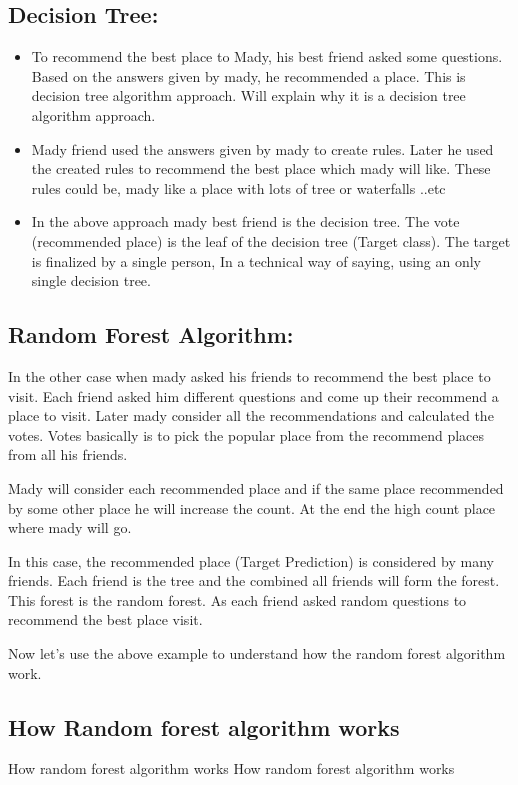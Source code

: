\documentclass[a4paper,12pt]{article}
\begin{document}
\subsection*{Decision Tree:}
\begin{itemize}
	\item To recommend the best place to Mady, his best friend asked some questions. Based on the answers given by mady, he recommended a place. This is decision tree algorithm approach. Will explain why it is a decision tree algorithm approach.
	
\item	Mady friend used the answers given by mady to create rules. Later he used the created rules to recommend the best place which mady will like. These rules could be, mady like a place with lots of tree or waterfalls ..etc
	
\item In the above approach mady best friend is the decision tree. The vote (recommended place) is the leaf of the decision tree (Target class). The target is finalized by a single person, In a technical way of saying, using an only single decision tree.
\end{itemize}


\subsection*{Random Forest Algorithm:}
In the other case when mady asked his friends to recommend the best place to visit. Each friend asked him different questions and come up their recommend a place to visit. Later mady consider all the recommendations and calculated the votes. Votes basically is to pick the popular place from the recommend places from all his friends.

Mady will consider each recommended place and if the same place recommended by some other place he will increase the count. At the end the high count place where mady will go.

In this case, the recommended place (Target Prediction) is considered by many friends. Each friend is the tree and the combined all friends will form the forest. This forest is the random forest. As each friend asked random questions to recommend the best place visit.

Now let’s use the above example to understand how the random forest algorithm work.

\subsection*{How Random forest algorithm works}
How random forest algorithm works
How random forest algorithm works
\end{document}
